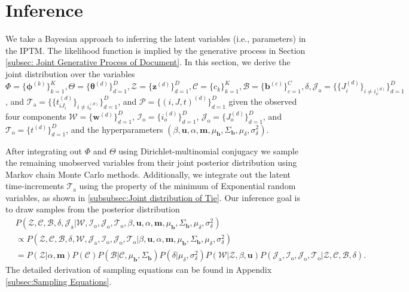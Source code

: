 \documentclass[a4paper]{article}
\begin{document}
	\section{Inference} \label{sec: Inference}


		
We take a Bayesian approach to inferring the latent variables (i.e., parameters) in the IPTM. The likelihood function is implied by the generative process in Section \ref{subsec: Joint Generative Process of Document}. In this section, we derive the joint distribution over the variables $\Phi=\{\boldsymbol{\phi}^{(k)}\}_{k=1}^{K}, \Theta=\{\boldsymbol{\theta}^{(d)} \}_{d=1}^{D},\mathcal{Z}=\{\boldsymbol{z}^{(d)} \}_{d=1}^{D}, \mathcal{C}=\{{c}_k \}_{k=1}^{K}, \mathcal{B}=\{\boldsymbol{b}^{(c)} \}_{c=1}^{C}, \delta,   \mathcal{J}_{\mbox{a}}=\{\{J_i^{(d)}\}_{i\neq i_o^{(d)}}\}_{d=1}^D$, and $\mathcal{T}_{\mbox{a}}=\{\{t_{iJ_i}^{(d)}\}_{i\neq i_o^{(d)}}\}_{d=1}^D$, and $\mathcal{P}=\{(i, J, t)^{(d)}\}_{d=1}^D$ given the observed four components $\mathcal{W}=\{\boldsymbol{w}^{(d)} \}_{d=1}^{D}$, $\mathcal{I}_{\mbox{o}}=\{i_o^{(d)}\}_{d=1}^D$,  $\mathcal{J}_{\mbox{o}}=\{J_o^{(d)}\}_{d=1}^D$, and $\mathcal{T}_{\mbox{o}}= \{t^{(d)}\}_{d=1}^D$, and the hyperparameters $(\beta, \boldsymbol{u}, \alpha, \boldsymbol{m}, \mu_{\boldsymbol{b}}, \Sigma_{\boldsymbol{b}}, \mu_\delta, \sigma^2_\delta)$.
	
After integrating out $\Phi$ and $\Theta$ using Dirichlet-multinomial conjugacy \citep{griffiths2004finding} we sample the remaining unobserved variables from their joint posterior distribution using Markov chain Monte Carlo methods. Additionally, we integrate out the latent time-increments $\mathcal{T}_{\mbox{a}}$ using the property of the minimum of Exponential random variables, as shown in \ref{subsubsec:Joint distribution of Tie}. Our inference goal is to draw samples from the posterior distribution
	  \begin{equation}
	  \begin{aligned}
	  &P(\mathcal{Z}, \mathcal{C}, \mathcal{B}, \delta, \mathcal{J}_{\mbox{a}}|\mathcal{W}, \mathcal{I}_{\mbox{o}}, \mathcal{J}_{\mbox{o}}, \mathcal{T}_{\mbox{o}}, \beta, \boldsymbol{u}, \alpha, \boldsymbol{m}, \mu_{\boldsymbol{b}}, \Sigma_{\boldsymbol{b}}, \mu_\delta, \sigma^2_\delta) \\
	  &\propto 	P(\mathcal{Z}, \mathcal{C}, \mathcal{B}, \delta, \mathcal{W}, \mathcal{J}_{\mbox{a}}, \mathcal{I}_{\mbox{o}}, \mathcal{J}_{\mbox{o}}, \mathcal{T}_{\mbox{o}} |\beta, \boldsymbol{u}, \alpha, \boldsymbol{m}, \mu_{\boldsymbol{b}}, \Sigma_{\boldsymbol{b}}, \mu_\delta, \sigma^2_\delta)\\&  = P(\mathcal{Z}|\alpha, \boldsymbol{m})P(\mathcal{C})P(\mathcal{B}|\mathcal{C}, \mu_{\boldsymbol{b}}, \Sigma_{\boldsymbol{b}})P(\delta | \mu_\delta, \sigma^2_\delta) P(\mathcal{W}|\mathcal{Z}, \beta, \boldsymbol{u})P(\mathcal{J}_{\mbox{a}}, \mathcal{I}_{\mbox{o}}, \mathcal{J}_{\mbox{o}}, \mathcal{T}_{\mbox{o}} |\mathcal{Z}, \mathcal{C}, \mathcal{B}, \delta).
	  \end{aligned}
	  \end{equation}
	 The detailed derivation of sampling equations can be found in Appendix \ref{subsec:Sampling Equations}. 
	  
\end{document}
